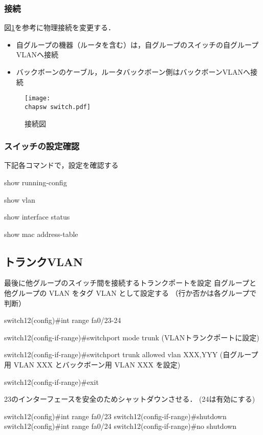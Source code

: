 \subsubsection{接続}

図\ref{fig:22:static}を参考に物理接続を変更する．

\begin{itemize}
\item 自グループの機器（ルータを含む）は，自グループのスイッチの自グループ VLANへ接続
\item バックボーンのケーブル，ルータバックボーン側はバックボーンVLANへ接続
\end{itemize}

\begin{figure}[htb]
  \begin{center}
   \texttt{[image: \\chapsw switch.pdf]}
   \caption{接続図}
   \label{fig:22:static}
  \end{center}
\end{figure}


\subsubsection{スイッチの設定確認}

\begin{cli}
下記各コマンドで，設定を確認する

show running-config

show vlan

show interface status

show mac address-table
\end{cli}

\subsection{トランクVLAN}

\begin{cli}
最後に他グループのスイッチ間を接続するトランクポートを設定
自グループと他グループの VLAN をタグ VLAN として設定する
（行か否かは各グループで判断）

switch12(config)#int range fa0/23-24

switch12(config-if-range)#switchport mode trunk
  (VLANトランクポートに設定)

switch12(config-if-range)#switchport trunk allowed vlan XXX,YYY
  (自グループ用 VLAN XXX とバックボーン用 VLAN XXX を設定)

switch12(config-if-range)#exit

23のインターフェースを安全のためシャットダウンさせる．
(24は有効にする)

switch12(config)#int range fa0/23
switch12(config-if-range)#shutdown
switch12(config)#int range fa0/24
switch12(config-if-range)#no shutdown

\end{cli}

